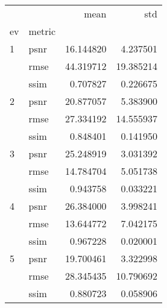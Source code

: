 \begin{tabular}{llrr}
\toprule
  &      &       mean &        std \\
ev & metric &            &            \\
\midrule
1 & psnr &  16.144820 &   4.237501 \\
  & rmse &  44.319712 &  19.385214 \\
  & ssim &   0.707827 &   0.226675 \\
2 & psnr &  20.877057 &   5.383900 \\
  & rmse &  27.334192 &  14.555937 \\
  & ssim &   0.848401 &   0.141950 \\
3 & psnr &  25.248919 &   3.031392 \\
  & rmse &  14.784704 &   5.051738 \\
  & ssim &   0.943758 &   0.033221 \\
4 & psnr &  26.384000 &   3.998241 \\
  & rmse &  13.644772 &   7.042175 \\
  & ssim &   0.967228 &   0.020001 \\
5 & psnr &  19.700461 &   3.322998 \\
  & rmse &  28.345435 &  10.790692 \\
  & ssim &   0.880723 &   0.058906 \\
\bottomrule
\end{tabular}
